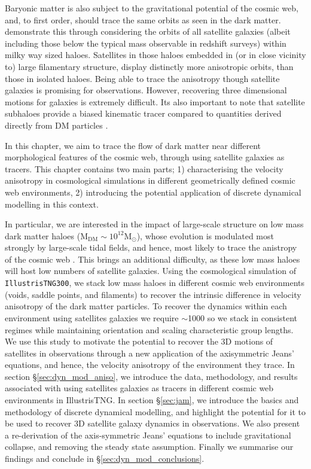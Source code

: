 Baryonic matter is also subject to the gravitational potential of the cosmic web, and, to first order, should trace the same orbits as seen in the dark matter. \citet{garaldi2018} demonstrate this through considering the orbits of all satellite galaxies (albeit including those below the typical mass observable in redshift surveys) within milky way sized haloes. Satellites in those haloes embedded in (or in close vicinity to) large filamentary structure, display distinctly more anisotropic orbits, than those in isolated haloes. Being able to trace the anisotropy though satellite galaxies is promising for observations. However, recovering three dimensional motions for galaxies is extremely difficult. Its also important to note that satellite subhaloes provide a biased kinematic tracer compared to quantities derived directly from DM particles \citep[with velocity dispersion of satellites being systematically smaller than measured from DM particles;][]{elahi2018}. 

In this chapter, we aim to trace the flow of dark matter near different morphological features of the cosmic web, through using satellite galaxies as tracers. This chapter contains two main parts; 1) characterising the velocity anisotropy in cosmological simulations in different geometrically defined cosmic web environments, 2) introducing the potential application of discrete dynamical modelling in this context.

In particular, we are interested in the impact of large-scale structure on low mass dark matter haloes ($\mathrm{M_{DM} \sim 10^{12}M_{\odot}}$), whose evolution is modulated most strongly by large-scale tidal fields, and hence, most likely to trace the anistropy of the cosmic web \citep[e.g.][]{tojeiro2017}. This brings an additional difficulty, as these low mass haloes will host low numbers of satellite galaxies. Using the cosmological simulation of \texttt{IllustrisTNG300}, we stack low mass haloes in different cosmic web environments (voids, saddle points, and filaments) to recover the intrinsic difference in velocity anisotropy of the dark matter particles. To recover the dynamics within each environment using satellites galaxies we require $\sim$1000 so we stack in consistent regimes while maintaining orientation and scaling characteristic group lengths. We use this study to motivate the potential to recover the 3D motions of satellites in observations through a new application of the axisymmetric Jeans' equations, and hence, the velocity anisotropy of the environment they trace. In section \S\ref{sec:dyn_mod_aniso}, we introduce the data, methodology, and results associated with using satellites galaxies as tracers in different cosmic web environments in IllustrisTNG. In section \S\ref{sec:jam}, we introduce the basics and methodology of discrete dynamical modelling, and highlight the potential for it to be used to recover 3D satellite galaxy dynamics in observations. We also present a re-derivation of the axis-symmetric Jeans' equations to include gravitational collapse, and removing the steady state assumption. Finally we summarise our findings and conclude in \S\ref{sec:dyn_mod_conclusions}.

